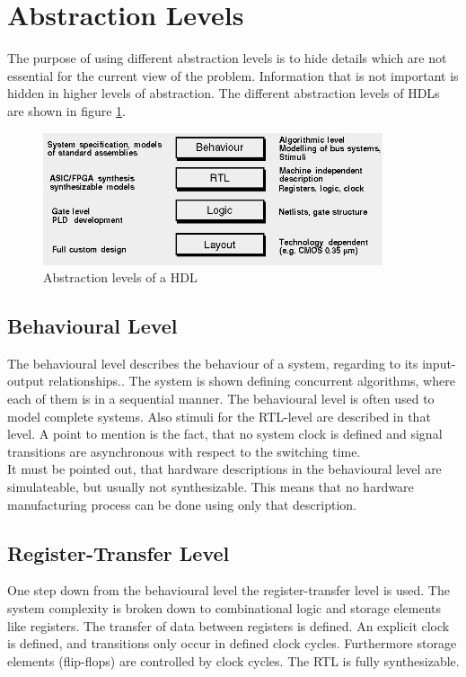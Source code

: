 \section{Abstraction Levels}
The purpose of using different abstraction levels is to hide details which are not essential for the current view of the problem. Information that is not important is hidden in higher levels of abstraction. The different abstraction levels of HDLs are shown in figure \ref{fig:hdlabstractionlevels}.
\begin{figure}[htbp]
\begin{center}
\includegraphics[width=10cm,keepaspectratio=true]{bilder/png/hdlabstractionlevels}
\caption{Abstraction levels of a HDL \cite{Ver16}}
\label{fig:hdlabstractionlevels}
\end{center}
\end{figure}
\subsection{Behavioural Level}
The behavioural level describes the behaviour of a system, regarding to its input-output relationships.\cite{Hartenstein1987}. The system is shown defining concurrent algorithms, where each of them is in a sequential manner. The behavioural level is often used to model complete systems. Also stimuli for the RTL-level are described in that level. A point to mention is the fact, that no system clock is defined and signal transitions are asynchronous with respect to the switching time.\\
It must be pointed out, that hardware descriptions in the behavioural level are simulateable, but usually not synthesizable. This means that no hardware manufacturing process can be done using only that description.\cite{Ver16}
\subsection{Register-Transfer Level}
One step down from the behavioural level the register-transfer level is used. The system complexity is broken down to combinational logic and storage elements like registers. The transfer of data between registers is defined. An explicit clock is defined, and transitions only occur in defined clock cycles. Furthermore storage elements (flip-flops) are controlled by clock cycles. The RTL is fully synthesizable.\cite{Ver16}\cite{Asic14}

